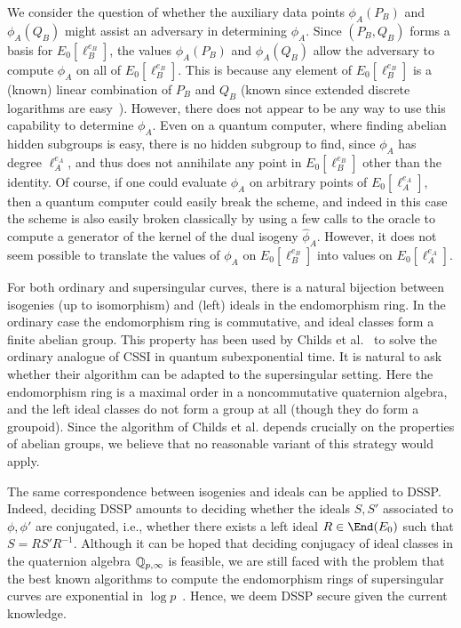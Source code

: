 We consider the question of whether the auxiliary data points
$\phi_A(P_B)$ and $\phi_A(Q_B)$ might assist an adversary in
determining $\phi_A$. Since $(P_B,Q_B)$ forms a basis for
$E_0[\ell_B^{e_B}]$, the values $\phi_A(P_B)$ and $\phi_A(Q_B)$ allow
the adversary to compute $\phi_A$ on all of $E_0[\ell_B^{e_B}]$. This
is because any element of $E_0[\ell_B^{e_B}]$ is a (known) linear
combination of $P_B$ and $Q_B$ (known since extended discrete
logarithms are easy~\cite{teske-ph}). However, there does not appear
to be any way to use this capability to determine $\phi_A$. Even on a
quantum computer, where finding abelian hidden subgroups is easy,
there is no hidden subgroup to find, since $\phi_A$ has degree
$\ell_A^{e_A}$, and thus does not annihilate any point in
$E_0[\ell_B^{e_B}]$ other than the identity. Of course, if one could
evaluate $\phi_A$ on arbitrary points of $E_0[\ell_A^{e_A}]$, then a
quantum computer could easily break the scheme, and indeed in this case the
scheme is also easily broken classically by using a few calls to the
oracle to compute a generator of the kernel of the dual isogeny 
$\hat{\phi}_A$. However, it does not seem possible to translate the values of
$\phi_A$ on $E_0[\ell_B^{e_B}]$ into values on $E_0[\ell_A^{e_A}]$.

For both ordinary and supersingular curves, there is a natural
bijection between isogenies (up to isomorphism) and (left) ideals in
the endomorphism ring. In the ordinary case the endomorphism ring is
commutative, and ideal classes form a finite abelian group. This
property has been used by Childs et al.~\cite{childs2014constructing} to solve the
ordinary analogue of CSSI in quantum subexponential time. It is
natural to ask whether their algorithm can be adapted to the
supersingular setting. Here the
endomorphism ring is a maximal order in a noncommutative quaternion
algebra, and the left ideal classes do not form a group at all (though
they do
form a groupoid). Since the algorithm of Childs et al. depends
crucially on the properties of abelian groups, we believe that no
reasonable variant of this strategy would apply.

The same correspondence between isogenies and ideals can be applied to
DSSP. Indeed, deciding DSSP amounts to deciding whether the ideals
$S,S'$ associated to $\phi,\phi'$ are conjugated, i.e., whether there
exists a left ideal $R\in\End(E_0)$ such that $S=RS'R^{-1}$. Although
it can be hoped that deciding conjugacy of ideal classes in the
quaternion algebra ${\mathbb{Q}}_{p,\infty}$ is feasible, we are still faced
with the problem that the best known algorithms to compute the
endomorphism rings of supersingular curves are exponential in $\log
p$~\cite{kohel,cervino04,belding08-thesis}. Hence, we deem DSSP secure
given the current knowledge.

